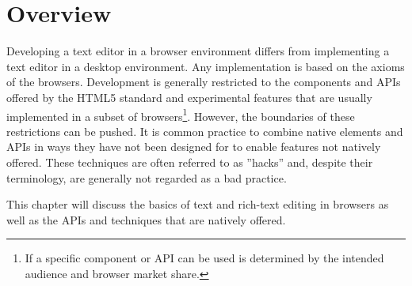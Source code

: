 
\section{Overview}

Developing a text editor in a browser environment differs from implementing a text editor in a desktop environment. Any implementation is based on the axioms of the browsers. Development is generally restricted to the components and APIs offered by the HTML5 standard and experimental features that are usually implemented in a subset of browsers\footnote{If a specific component or API can be used is determined by the intended audience and browser market share.}. However, the boundaries of these restrictions can be pushed. It is common practice to combine native elements and APIs in ways they have not been designed for to enable features not natively offered. These techniques are often referred to as ''hacks'' and, despite their terminology, are generally not regarded as a bad practice.

This chapter will discuss the basics of text and rich-text editing in browsers as well as the APIs and techniques that are natively offered.%




